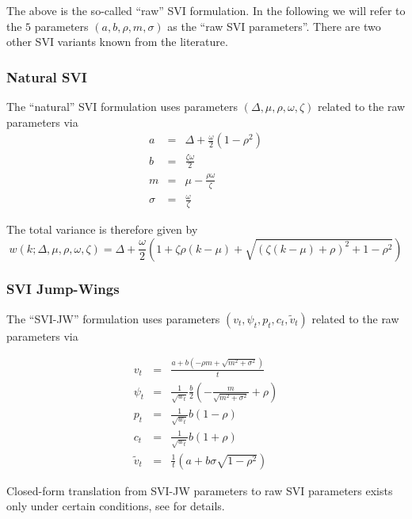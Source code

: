 \documentclass{amsart}
\theoremstyle{plain}
\numberwithin{equation}{section}
\begin{document}
The above is the so-called ``raw'' SVI formulation. In the
following we will refer to the $5$ parameters $(a,b,\rho,m,\sigma)$ as the ``raw SVI parameters''.
There are two other SVI variants known from the literature.

\subsubsection{Natural SVI}\label{sec:naturalsvi}

The ``natural'' SVI formulation uses parameters $(\Delta, \mu, \rho, \omega, \zeta)$ related to the raw parameters via
\begin{eqnarray}
a &=& \Delta + \frac{\omega}{2} (1 - \rho^2) \\
b &=& \frac{\zeta \omega}{2} \\
m &=& \mu - \frac{\rho \omega}{\zeta} \\
\sigma &=& \frac{\omega}{\zeta}
\end{eqnarray}

The total variance is therefore given by
\begin{equation}
w(k; \Delta, \mu, \rho, \omega, \zeta) = \Delta + \frac{\omega}{2} \left( 1 + \zeta \rho (k - \mu) + \sqrt{(\zeta (k - \mu) + \rho)^2 + 1 - \rho^2} \right)
\end{equation}

\subsubsection{SVI Jump-Wings}\label{sec:svijw}

The ``SVI-JW'' formulation uses parameters $(v_t, \psi_t, p_t, c_t, \tilde{v}_t)$ related to the raw parameters via

\begin{eqnarray}
v_t &=& \frac{a + b (- \rho m + \sqrt{m^2 + \sigma^2})}{t} \\
\psi_t &=& \frac{1}{\sqrt{w_t}} \frac{b}{2} (-\frac{m}{\sqrt{m^2 + \sigma^2}} + \rho)  \\
p_t &=& \frac{1}{\sqrt{w_t}}  b (1 - \rho) \\
c_t &=& \frac{1}{\sqrt{w_t}}  b (1 + \rho) \\
\tilde{v}_t &=& \frac{1}{t}(a + b \sigma \sqrt{1 - \rho^2})
\end{eqnarray}

Closed-form translation from SVI-JW parameters to raw SVI parameters exists only under certain conditions, see
\cite{Gatheral_2004} for details.
\end{document}
